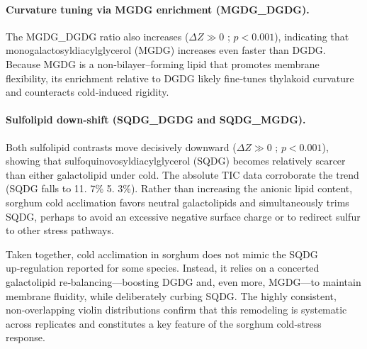 \documentclass[10pt,letterpaper]{article}
\begin{document}
\paragraph{Curvature tuning via MGDG enrichment (MGDG_DGDG).}
The MGDG_DGDG ratio also increases ($\Delta Z \gg 0$ ; $p < 0.001$), indicating that monogalactosyldiacylglycerol (MGDG) increases even faster than DGDG. Because MGDG is a non‑bilayer–forming lipid that promotes membrane flexibility, its enrichment relative to DGDG likely fine‑tunes thylakoid curvature and counteracts cold‑induced rigidity.

\paragraph{Sulfolipid down‑shift (SQDG_DGDG and SQDG_MGDG).}
Both sulfolipid contrasts move decisively downward ($\Delta Z \gg 0$ ; $p < 0.001$), showing that sulfoquinovosyldiacylglycerol (SQDG) becomes relatively scarcer than either galactolipid under cold. The absolute TIC data corroborate the trend (SQDG falls to 11. 7\% 5. 3\%). Rather than increasing the anionic lipid content, sorghum cold acclimation favors neutral galactolipids and simultaneously trims SQDG, perhaps to avoid an excessive negative surface charge or to redirect sulfur to other stress pathways.

Taken together, cold acclimation in sorghum does not mimic the SQDG up‑regulation reported for some species. Instead, it relies on a concerted galactolipid re‑balancing—boosting DGDG and, even more, MGDG—to maintain membrane fluidity, while deliberately curbing SQDG. The highly consistent, non‑overlapping violin distributions confirm that this remodeling is systematic across replicates and constitutes a key feature of the sorghum cold‑stress response.
\end{document}
